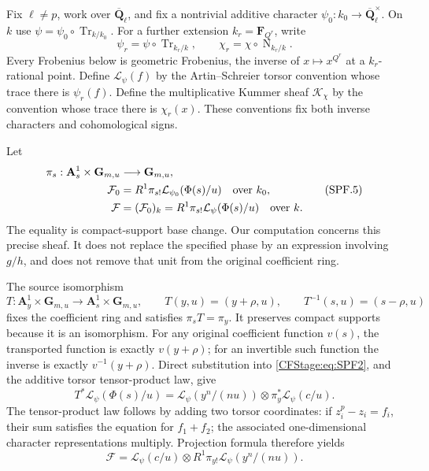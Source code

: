 Fix \(\ell\ne p\), work over \(\overline{\mathbf Q}_\ell\), and fix a
nontrivial additive character \(\psi_0:k_0\to
\overline{\mathbf Q}_\ell^\times\). On \(k\) use
\(\psi=\psi_0\circ\operatorname{Tr}_{k/k_0}\).
For a further extension \(k_r=\mathbf F_{Q^r}\), write
\[
 \psi_r=\psi\circ\operatorname{Tr}_{k_r/k},\qquad
 \chi_r=\chi\circ\operatorname{N}_{k_r/k}.
 \tag{SPF.4}\label{CFStage:eq:SPF4}
\]
Every Frobenius below is geometric Frobenius, the inverse of
\(x\mapsto x^{Q^r}\) at a \(k_r\)-rational point. Define
\(\mathcal L_\psi(f)\) by the Artin--Schreier torsor convention whose
trace there is \(\psi_r(f)\). Define the multiplicative Kummer sheaf
\(\mathcal K_\chi\) by the convention whose trace there is
\(\chi_r(x)\). These conventions fix both inverse characters and
cohomological signs.

Let
\[
 \begin{split}
 \pi_s:\mathbf A^1_s\times\mathbf G_{m,u}&\longrightarrow
                  \mathbf G_{m,u},\\
 \mathcal F_0&=R^1\pi_{s!}\mathcal L_{\psi_0}(\Phi(s)/u)
                    \quad\hbox{over }k_0,\\
 \mathcal F&=(\mathcal F_0)_k
       =R^1\pi_{s!}\mathcal L_\psi(\Phi(s)/u)
                    \quad\hbox{over }k .
 \end{split}
 \tag{SPF.5}\label{CFStage:eq:SPF5}
\]
The equality is compact-support base change. Our computation concerns
this precise sheaf. It does not replace the specified phase by
an expression involving \(g/h\), and does not remove that unit from
the original coefficient ring.

The source isomorphism
\[
 T:\mathbf A^1_y\times\mathbf G_{m,u}
       \longrightarrow\mathbf A^1_s\times\mathbf G_{m,u},
 \qquad T(y,u)=(y+\rho,u),\qquad
 T^{-1}(s,u)=(s-\rho,u)
 \tag{SPF.6}\label{CFStage:eq:SPF6}
\]
fixes the coefficient ring and satisfies \(\pi_sT=\pi_y\).
It preserves compact supports because it is an isomorphism.
For any original coefficient function \(v(s)\), the transported
function is exactly \(v(y+\rho)\); for an invertible such function
the inverse is exactly \(v^{-1}(y+\rho)\).
Direct substitution into \eqref{CFStage:eq:SPF2}, and the additive torsor
tensor-product law, give
\[
 T^*\mathcal L_\psi(\Phi(s)/u)
  =\mathcal L_\psi(y^n/(nu))
      \otimes\pi_y^*\mathcal L_\psi(c/u).
 \tag{SPF.7}\label{CFStage:eq:SPF7}
\]
The tensor-product law follows by adding two torsor coordinates:
if \(z_i^p-z_i=f_i\), their sum satisfies the equation for \(f_1+f_2\);
the associated one-dimensional character representations multiply.
Projection formula therefore yields
\[
 \mathcal F=
 \mathcal L_\psi(c/u)\otimes
 R^1\pi_{y!}\mathcal L_\psi(y^n/(nu)).
 \tag{SPF.8}\label{CFStage:eq:SPF8}
\]


